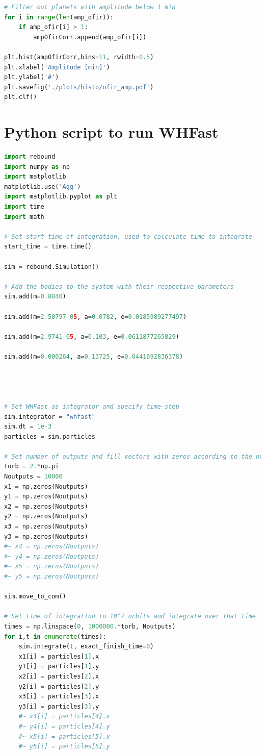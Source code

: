 \documentclass[12pt]{report}
\begin{document}
\begin{appendix}
\begin{lstlisting}[language=Python]
# Filter out planets with amplitude below 1 min
for i in range(len(amp_ofir)):
	if amp_ofir[i] > 1:
		ampOfirCorr.append(amp_ofir[i])

plt.hist(ampOfirCorr,bins=11, rwidth=0.5)
plt.xlabel('Amplitude [min]')
plt.ylabel('#')
plt.savefig('./plots/histo/ofir_amp.pdf')
plt.clf()	
\end{lstlisting}
\chapter{Python script to run WHFast}
\begin{lstlisting}[language=Python]
import rebound
import numpy as np
import matplotlib
matplotlib.use('Agg')
import matplotlib.pyplot as plt
import time
import math

# Set start time of integration, used to calculate time to integrate
start_time = time.time()

sim = rebound.Simulation()

# Add the bodies to the system with their respective parameters
sim.add(m=0.8840)

sim.add(m=2.50797-05, a=0.0782, e=0.0185989277497)

sim.add(m=2.9741-05, a=0.103, e=0.0611877265829)

sim.add(m=0.000264, a=0.13725, e=0.0441692836378)




# Set WHFast as integrator and specify time-step
sim.integrator = "whfast"
sim.dt = 1e-3
particles = sim.particles

# Set number of outputs and fill vectors with zeros according to the number of outputs. The number of x and y depends on the number of planets in the system
torb = 2.*np.pi
Noutputs = 10000
x1 = np.zeros(Noutputs)
y1 = np.zeros(Noutputs)
x2 = np.zeros(Noutputs)
y2 = np.zeros(Noutputs)
x3 = np.zeros(Noutputs)
y3 = np.zeros(Noutputs)
#~ x4 = np.zeros(Noutputs)
#~ y4 = np.zeros(Noutputs)
#~ x5 = np.zeros(Noutputs)
#~ y5 = np.zeros(Noutputs)

sim.move_to_com()

# Set time of integration to 10^7 orbits and integrate over that time
times = np.linspace(0, 1000000.*torb, Noutputs)
for i,t in enumerate(times):
    sim.integrate(t, exact_finish_time=0)
    x1[i] = particles[1].x
    y1[i] = particles[1].y
    x2[i] = particles[2].x
    y2[i] = particles[2].y
    x3[i] = particles[3].x
    y3[i] = particles[3].y
    #~ x4[i] = particles[4].x
    #~ y4[i] = particles[4].y
    #~ x5[i] = particles[5].x
    #~ y5[i] = particles[5].y


\end{lstlisting}
\end{appendix}
\end{document}
